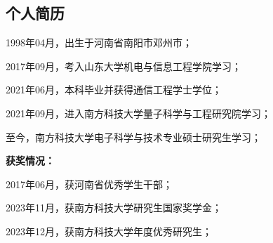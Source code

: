 
\begin{resume}

  \section*{个人简历} %

  1998年04月，出生于河南省南阳市邓州市；

  2017年09月，考入山东大学机电与信息工程学院学习；
  
  2021年06月，本科毕业并获得通信工程学士学位；

  2021年09月，进入南方科技大学量子科学与工程研究院学习；
  
  至今，南方科技大学电子科学与技术专业硕士研究生学习；

  \textbf{获奖情况：}



  2017年06月，获河南省优秀学生干部；

  2023年11月，获南方科技大学研究生国家奖学金；

  2023年12月，获南方科技大学年度优秀研究生；
  







\end{resume}
